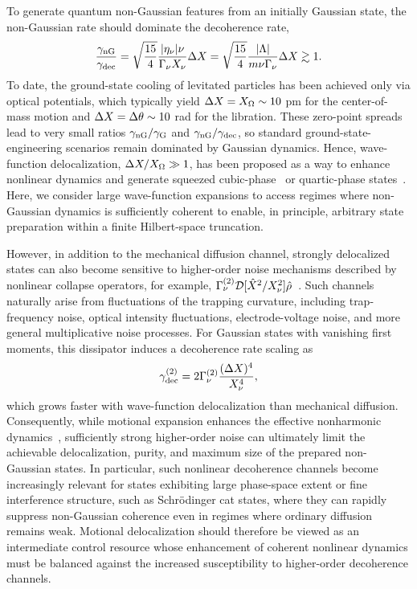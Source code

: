 \documentclass[reprint,prx,footinbib,floatfix,twocolumn,longbibliography,superscriptaddress]{revtex4-2}
\begin{document}
To generate quantum non-Gaussian features from an initially Gaussian state, the non-Gaussian rate should dominate the decoherence rate,
\begin{align}
    \frac{\gamma_{\text{nG}}}{\gamma_{\text{dec}}} = \sqrt{\frac{15}{4}}  \frac{|\eta_{\nu}| \nu}{\Gamma_{\nu} X_{\nu}}  \Delta X = \sqrt{\frac{15}{4}} \frac{|\Lambda|}{m \nu \Gamma_{\nu} } \Delta X \gtrsim 1.
\end{align}
To date, the ground-state cooling of levitated particles has been achieved only via optical potentials, which typically yield $ \Delta X = X_{\Omega}  \sim 10$ pm for the center-of-mass motion and $ \Delta X = \Delta \theta \sim 10$ {\textmu}rad for the libration.
These zero-point spreads lead to very small ratios $\gamma_{\text{nG}} / \gamma_{\text{G}}$ and $\gamma_{\text{nG}} / \gamma_{\text{dec}}$, so standard ground-state-engineering scenarios remain dominated by Gaussian dynamics.
Hence, wave-function delocalization, $\Delta X / X_{\Omega} \gg 1$, has been proposed as a way to enhance nonlinear dynamics and generate squeezed cubic-phase~\cite{Rakhubovsky2021,Neumeier2024,Roda-Llordes2024b} or quartic-phase states~\cite{Rosiek2024}.
Here, we consider large wave-function expansions to access regimes where non-Gaussian dynamics is sufficiently coherent to enable, in principle, arbitrary state preparation within a finite Hilbert-space truncation.

However, in addition to the mechanical diffusion channel, strongly delocalized states can also become sensitive to higher-order noise mechanisms described by nonlinear collapse operators, for example, $\Gamma^{(2)}_{\nu}\mathcal{D}[\hat{X}^2/X_{\nu}^2]\hat{\rho}$~\cite{Riera-Campeny2024}.
Such channels naturally arise from fluctuations of the trapping curvature, including trap-frequency noise, optical intensity fluctuations, electrode-voltage noise, and more general multiplicative noise processes.
For Gaussian states with vanishing first moments, this dissipator induces a decoherence rate scaling as
\begin{align}
    \gamma_{\text{dec}}^{(2)}= 2\Gamma^{(2)}_{\nu}\frac{(\Delta X)^4}{X_{\nu}^4},
\end{align}
which grows faster with wave-function delocalization than mechanical diffusion.
Consequently, while motional expansion enhances the effective nonharmonic dynamics~\cite{Rosiek2024}, sufficiently strong higher-order noise can ultimately limit the achievable delocalization, purity, and maximum size of the prepared non-Gaussian states.
In particular, such nonlinear decoherence channels become increasingly relevant for states exhibiting large phase-space extent or fine interference structure, such as Schrödinger cat states, where they can rapidly suppress non-Gaussian coherence even in regimes where ordinary diffusion remains weak.
Motional delocalization should therefore be viewed as an intermediate control resource whose enhancement of coherent nonlinear dynamics must be balanced against the increased susceptibility to higher-order decoherence channels.
\end{document}
